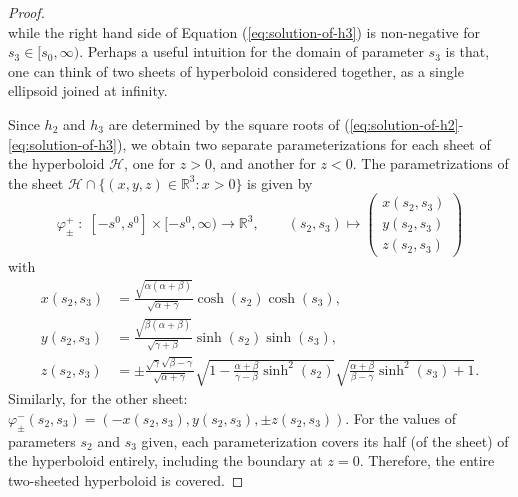 \documentclass[10pt, a4paper]{article}
\theoremstyle{BoldTopSpacing}
\theoremstyle{BoldTopSpacing}
\theoremstyle{BoldTopSpacing}
\theoremstyle{BoldTopBottomSpacing}
\theoremstyle{BoldTopSpacing}
\theoremstyle{BoldTopBottomSpacing}
\theoremstyle{remark}
\begin{document}
\begin{proof}
\[\]
while the right hand side of Equation (\ref{eq:solution-of-h3}) is non-negative for $s_{3} \in [s_{0}, \infty)$. Perhaps a useful intuition for the domain of parameter $s_{3}$ is that, one can think of two sheets of hyperboloid \textemdash considered together, as a single ellipsoid joined at infinity. \par
Since $h_{2}$ and $h_{3}$ are determined by the square roots of (\ref{eq:solution-of-h2}-\ref{eq:solution-of-h3}), we obtain two separate parameterizations for each sheet of the hyperboloid $\mathcal{H}$, one for $z > 0$, and another for $z < 0$. The parametrizations of the sheet $\mathcal{H} \cap \{ (x, y, z) \in \mathbb{R}^3 : x > 0\}$ is given by
\[
    \varphi^{+}_{\pm} \; : \; [-s^{0}, s^{0}] \times [-s^{0}, \infty) \to \mathbb{R}^3, \quad \quad (s_{2}, s_{3}) \mapsto \begin{pmatrix}
        x(s_{2}, s_{3}) \\
        y(s_{2}, s_{3}) \\
        z(s_{2}, s_{3})
        \end{pmatrix}
\]
with
\begin{align*}
    x(s_2, s_3) &= \frac{\sqrt{\alpha (\alpha + \beta)}}{\sqrt{\alpha + \gamma}} \cosh(s_2) \cosh(s_3), \\
    y(s_2, s_3) &= \frac{\sqrt{\beta (\alpha + \beta)}}{\sqrt{\gamma + \beta}} \sinh(s_2) \sinh(s_3), \\
    z(s_2, s_3) &= \pm \frac{\sqrt{\gamma} \sqrt{\beta - \gamma}}{\sqrt{\alpha + \gamma}} \sqrt{1 - \frac{\alpha + \beta}{\gamma - \beta} \sinh^2(s_{2})} \sqrt{\frac{\alpha + \beta}{\beta - \gamma} \sinh^2(s_{3}) + 1}.
\end{align*}
Similarly, for the other sheet: $\varphi^{-}_{\pm}(s_2, s_3) = \left(-x(s_{2}, s_{3}), y(s_{2}, s_{3}), \pm z(s_{2}, s_{3}) \right)$.
For the values of parameters $s_{2}$ and $s_{3}$ given, each parameterization covers its half (of the sheet) of the hyperboloid entirely, including the boundary at $z = 0$. Therefore, the entire two-sheeted hyperboloid is covered.
\end{proof}
\pagebreak
\end{document}
